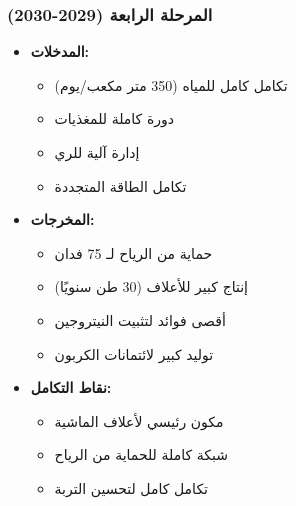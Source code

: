 \subsubsection{المرحلة الرابعة (2029-2030)}
\begin{itemize}
    \item \textbf{المدخلات:}
    \begin{itemize}
        \item تكامل كامل للمياه (350 متر مكعب/يوم)
        \item دورة كاملة للمغذيات
        \item إدارة آلية للري
        \item تكامل الطاقة المتجددة
    \end{itemize}
    \item \textbf{المخرجات:}
    \begin{itemize}
        \item حماية من الرياح لـ 75 فدان
        \item إنتاج كبير للأعلاف (30 طن سنويًا)
        \item أقصى فوائد لتثبيت النيتروجين
        \item توليد كبير لائتمانات الكربون
    \end{itemize}
    \item \textbf{نقاط التكامل:}
    \begin{itemize}
        \item مكون رئيسي لأعلاف الماشية
        \item شبكة كاملة للحماية من الرياح
        \item تكامل كامل لتحسين التربة
    \end{itemize}
\end{itemize}

